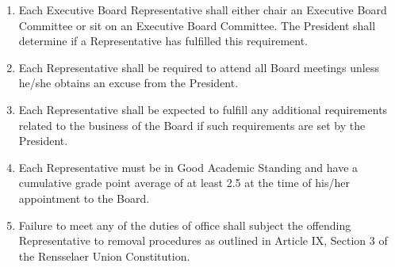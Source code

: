 
\begin{enumerate}
\item Each Executive Board Representative shall either chair an Executive Board Committee or sit on an Executive Board Committee. The President shall determine if a Representative has fulfilled this requirement.
\item Each Representative shall be required to attend all Board meetings unless he/she obtains an excuse from the President.
\item Each Representative shall be expected to fulfill any additional requirements related to the business of the Board if such requirements are set by the President.
\item Each Representative must be in Good Academic Standing and have a cumulative grade point average of at least 2.5 at the time of his/her appointment to the Board.
\item Failure to meet any of the duties of office shall subject the offending Representative to removal procedures as outlined in Article IX, Section 3 of the Rensselaer Union Constitution.
\end{enumerate}